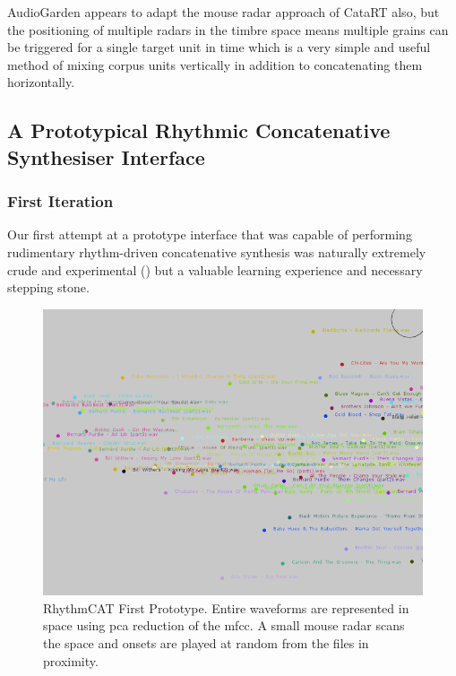 AudioGarden appears to adapt the mouse radar approach of CataRT also, but the positioning of multiple radars in the timbre space means multiple grains can be triggered for a single target unit in time which is a very simple and useful method of mixing corpus units vertically in addition to concatenating them horizontally.

\subsection{A Prototypical Rhythmic Concatenative Synthesiser Interface}

\subsubsection{First Iteration}

Our first attempt at a prototype interface that was capable of performing rudimentary rhythm-driven concatenative synthesis was naturally extremely crude and experimental () but a valuable learning experience and necessary stepping stone.

\begin{figure}
	\begin{center}
		\includegraphics[width=1.0\textwidth]{ch06_rhythmcat/figures/rhythmcat_proto1.png}
	\end{center}
	\caption[RhythmCAT First Prototype]{RhythmCAT First Prototype. Entire waveforms are represented in space using \acrshort{pca} reduction of the \acrshort{mfcc}. A small mouse radar scans the space and onsets are played at random from the files in proximity.}
	\label{fig:rhythmcat_proto1}
\end{figure}

